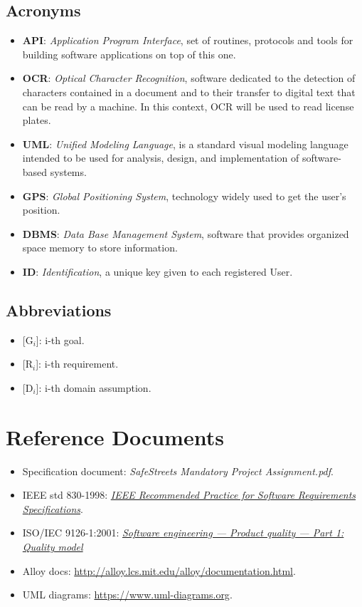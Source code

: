 \documentclass{report}
\begin{document}
\subsection{Acronyms}
\begin{itemize}
\item \textbf{API}: \textit{Application Program Interface}, set of routines, protocols and tools for building software applications on top of this one.
\item \textbf{OCR}: \textit{Optical Character Recognition}, software dedicated to the detection of characters contained in a document and to their transfer to digital text that can be read by a machine. In this context, OCR will be used to read license plates.
\item \textbf{UML}: \textit{Unified Modeling Language}, is a standard visual modeling language intended to be used for analysis, design, and implementation of software-based systems.
\item \textbf{GPS}: \textit{Global Positioning System}, technology widely used to get the user's position.
\item \textbf{DBMS}: \textit{Data Base Management System}, software that provides organized space memory to store information.
\item \textbf{ID}: \textit{Identification}, a unique key given to each registered User.
\end{itemize}
\subsection{Abbreviations}
\begin{itemize}
\item {[G$_{i}$]}: i-th goal.
\item {[R$_{i}$]}: i-th requirement.
\item {[D$_{i}$]}: i-th domain assumption.
\end{itemize}
\section{Reference Documents} \label{docs}
\begin{itemize}
	\item Specification document: \textit{SafeStreets Mandatory Project Assignment.pdf}.
	\item IEEE std 830-1998:  \href{http://www.math.uaa.alaska.edu/~afkjm/cs401/}{\textit{IEEE Recommended Practice for Software Requirements Specifications}}.
	\item ISO/IEC 9126-1:2001: \href{https://www.iso.org/standard/22749.html}{\textit{Software engineering — Product quality — Part 1: Quality model}}
	\item Alloy docs: \url{http://alloy.lcs.mit.edu/alloy/documentation.html}.
	\item UML diagrams: \url{https://www.uml-diagrams.org}.
\end{itemize}
\end{document}
